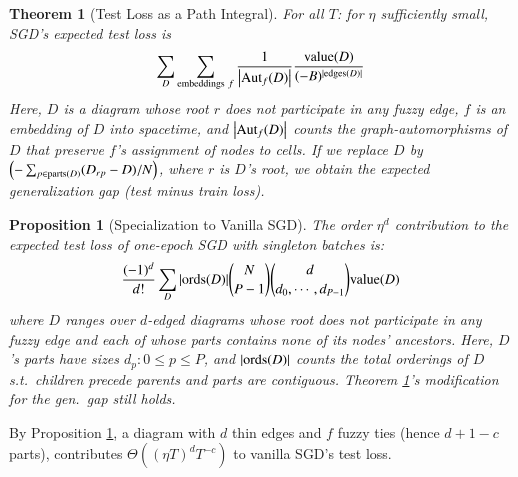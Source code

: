 \documentclass{article}
\theoremstyle{plain}
\newtheorem{thm}{Theorem}
\newtheorem{prop}{Proposition}
\theoremstyle{definition}
\newtheorem{exm}{Example}
\newcommand{\wrap}[1]{\left(#1\right)}
\newcommand{\wabs}[1]{\left|#1\right|}
\newcommand{\Aut}{\text{\textnormal{Aut}}}
\newcommand{\dvalue}{\text{\textnormal{value}}}
\newcommand{\edges}{\text{\textnormal{edges}}}
\newcommand{\ords}{\text{\textnormal{ords}}}
\newcommand{\parts}{\text{\textnormal{parts}}}
\begin{document}
        \begin{thm}[Test Loss as a Path Integral] \label{thm:sgdcoef}
            For all $T$: for $\eta$ sufficiently small, SGD's expected test
            loss is
            \begin{equation*}\label{eq:sgdcoef}
                \sum_{D}
                    \sum_{\text{embeddings}~f}
                    \frac{1}{\wabs{\Aut_f(D)}}
                \frac{\dvalue(D)}{(-B)^{|\edges(D)|}}
            \end{equation*}
            Here, $D$ is a diagram whose root $r$ does not participate in any fuzzy
            edge, $f$ is an embedding of $D$ into spacetime, and
            $\wabs{\Aut_f(D)}$ counts the graph-automorphisms of $D$ that
            preserve $f$'s assignment of nodes to cells.
            If we replace $D$ by 
            $
                \wrap{-\sum_{p \in \parts(D)} (D_{rp} - D)/N}
            $, where $r$ is $D$'s root,
            we obtain the expected generalization gap (test minus train loss).
        \end{thm}
    
        \begin{prop}[Specialization to Vanilla SGD] \label{prop:vanilla}
            The order $\eta^d$ contribution to the expected test loss of
            one-epoch SGD with singleton batches is:
            \begin{equation*}\label{eq:sgdbasiccoef}
                \frac{(-1)^d}{d!} \sum_{D} 
                |\ords(D)| {N \choose P-1} {d \choose d_0,\cdots,d_{P-1}}
                \dvalue(D)
            \end{equation*}
            where $D$ ranges over $d$-edged diagrams whose root
            does not participate in any fuzzy edge and each of whose parts contains
            none of its nodes' ancestors.  Here, $D$'s parts have sizes
            $d_p: 0\leq p\leq P$, and $|\ords(D)|$ counts the total
            orderings of $D$ s.t.\ children precede parents and parts are
            contiguous.
            Theorem \ref{thm:sgdcoef}'s modification for the gen.\ gap still
            holds.
        \end{prop}

        By Proposition \ref{prop:vanilla}, a diagram with $d$ thin edges and
        $f$ fuzzy ties (hence $d+1-c$ parts), contributes $\Theta\wrap{(\eta
        T)^d T^{-c}}$ to vanilla SGD's test loss.  
        
\end{document}
